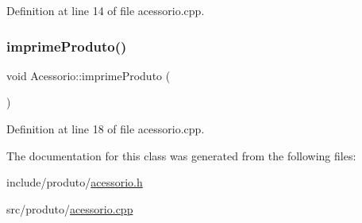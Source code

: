 Definition at line 14 of file acessorio.\+cpp.

\mbox{\label{class_acessorio_a5c746a8b87acb1505f2e5a7497a08379}} 
\subsubsection{\texorpdfstring{imprime\+Produto()}{imprimeProduto()}}
{\footnotesize\ttfamily void Acessorio\+::imprime\+Produto (\begin{DoxyParamCaption}{ }\end{DoxyParamCaption})}



Definition at line 18 of file acessorio.\+cpp.



The documentation for this class was generated from the following files\+:\begin{DoxyCompactItemize}
\item 
include/produto/\hyperlink{acessorio_8h}{acessorio.\+h}\item 
src/produto/\hyperlink{acessorio_8cpp}{acessorio.\+cpp}\end{DoxyCompactItemize}
